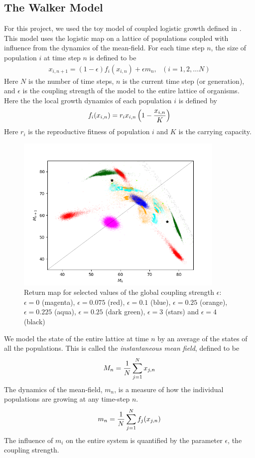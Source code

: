 \documentclass[conference]{IEEEtran}
\begin{document}
\subsection{The Walker Model}
\noindent For this project, we used the toy model of coupled logistic growth defined in \cite{Walker}. This model uses the logistic map on a lattice of populations coupled with influence from the dynamics of the mean-field.  For each time step $n$, the size of population $i$ at time step $n$ is defined to be
\begin{eqnarray}
x_{i, n+1} = (1 - \epsilon) f_i(x_{i,n}) + \epsilon m_n, \ \ \ (i=1, 2, \ldots N)
\label{coupling}
\end{eqnarray}
Here $N$ is the number of time steps, $n$ is the current time step (or generation), and $\epsilon$ is the coupling strength of the model to the entire lattice of organisms.   Here the the local growth dynamics of each population $i$ is defined by 
\begin{eqnarray}
f_i(x_{i,n}) = r_i x_{i,n} \left(1 - {x_{i,n} \over K}\right)
\label{individual}
\end{eqnarray}
Here $r_i$ is the reproductive fitness of population $i$ and $K$ is the carrying capacity.    
 \begin{figure}[t]
 \centering
    \includegraphics[width=100mm]{prettypicture}
    \caption{ Return map for selected values of  the global coupling strength $\epsilon$:  $\epsilon =0$ (magenta), $\epsilon = 0.075$ (red), $\epsilon = 0.1$ (blue), $\epsilon = 0.25$ (orange), $\epsilon = 0.225$ (aqua), $\epsilon = 0.25$ (dark green), $\epsilon = 3 $ (stars) and $\epsilon = 4$ (black)}
 \label{prettypicture}
\end{figure} 
\noindent We model the state of the entire lattice at time $n$ by an average of the states of all the populations.  This is called the {\it instantaneous mean field}, defined to be
\begin{eqnarray}
M_n = { 1 \over N} \sum _{j=1}^N x_{j,n}
\label{bigM}
\end{eqnarray}
 The dynamics of the mean-field, $m_n$, is a measure of how the individual populations are growing at any time-step $n$. 
 \begin{eqnarray}
 m_n = {1 \over N} \sum_{j=1}^N f_j(x_{j,n})
 \label{littlem}
\end{eqnarray}
The influence of $m_i$ on the entire system is quantified by the parameter $\epsilon$, the coupling strength.  \\
 
\end{document}
